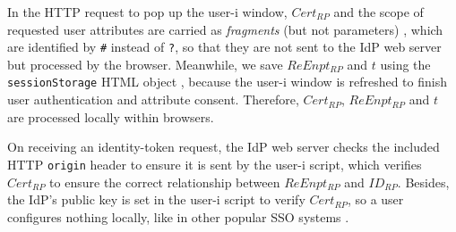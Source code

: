In the HTTP request to pop up the user-i window, $Cert_{RP}$ and the scope of requested user attributes are carried as \emph{fragments} (but not parameters) \cite{url-fragment}, which are identified by \texttt{\#} instead of \texttt{?},
    so that they are not sent to the IdP web server but processed by the browser.
Meanwhile, we save $ReEnpt_{RP}$ and $t$ using the \verb+sessionStorage+ HTML object \cite{htmlStorageHtml},
    because the user-i window is refreshed to finish user authentication and attribute consent.
Therefore, $Cert_{RP}$, $ReEnpt_{RP}$ and $t$ are processed locally within browsers.


On receiving an identity-token request, the IdP web server checks the included HTTP \texttt{origin} header to ensure it is sent by the user-i script,
which verifies $Cert_{RP}$ to ensure the correct relationship between $ReEnpt_{RP}$ and $ID_{RP}$.
Besides, the IdP's public key is set in the user-i script to verify $Cert_{RP}$,
so a user configures nothing locally,
 like in other popular SSO systems \cite{OpenIDConnect, rfc6749, SAML, SAMLIdentifier}.


